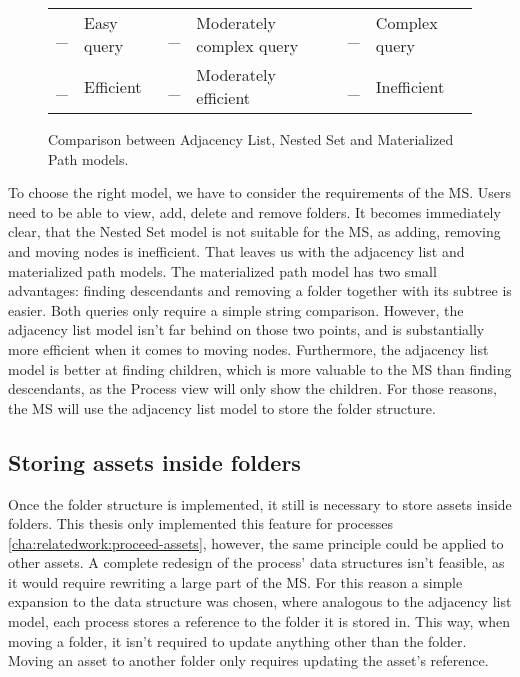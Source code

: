 \begin{itemize}
\begin{figure}[H]
\vspace{.5em}

\begin{tabular}{r@{: }l r@{: }l r@{: }l}
  \goodcomplexity{\textcircled{}}\vspace{-.8em} \_ & Easy query & \mediumcomplexity{}\vspace{-.8em} \_ &
  Moderately complex query &  \badcomplexity{}\vspace{-.8em} \_ & Complex query \\

  \_ \goodefficency{\textcircled{}} & Efficient & \_ \mediumefficency{} &
  Moderately efficient &  \_ \badefficency{} & Inefficient \\
\end{tabular}


\caption{Comparison between Adjacency List, Nested Set and Materialized Path models.}
\label{fig:comparison-db-tree-models}
\end{figure}

To choose the right model, we have to consider the requirements of the MS.
Users need to be able to view, add, delete and remove folders.
It becomes immediately clear, that the Nested Set model is not suitable for the MS, as
adding, removing and moving nodes is inefficient.
That leaves us with the adjacency list and materialized path models.
%
The materialized path model has two small advantages: finding descendants and removing a
folder together with its subtree is easier. 
Both queries only require a simple string comparison.
%
%
However, the adjacency list model isn't far behind on those two points, and is
substantially more efficient when it comes to moving nodes.
Furthermore, the adjacency list model is better at finding children, which is more
valuable to the MS than finding descendants, as the Process view will only show the
children.
For those reasons, the MS will use the adjacency list model to store the folder structure.

\subsection{Storing assets inside folders}

Once the folder structure is implemented, it still is necessary to store assets inside
folders.
This thesis only implemented this feature for processes
\ref{cha:relatedwork:proceed-assets}, however, the same principle could be applied to
other assets.
A complete redesign of the process' data structures isn't feasible, as it would require
rewriting a large part of the MS.
For this reason a simple expansion to the data structure was chosen, where analogous to
the adjacency list model, each process stores a reference to the folder it is stored in.
This way, when moving a folder, it isn't required to update anything other than the
folder.
Moving an asset to another folder only requires updating the asset's reference.


\end{itemize}
